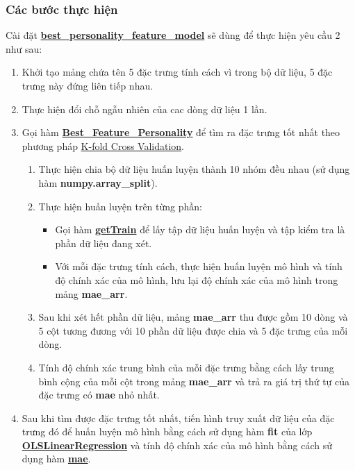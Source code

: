 \documentclass{report}
\begin{document}
        \subsubsection{Các bước thực hiện}
        Cài đặt \hyperref[sec:bestpersonalityfeaturemodel]{\textbf{best\_personality\_feature\_model}} sẽ dùng để thực hiện yêu cầu 2 như sau:
            \begin{enumerate}
                \item Khởi tạo mảng chứa tên 5 đặc trưng tính cách vì trong bộ dữ liệu, 5 đặc trưng này đứng liên tiếp nhau.
                \item Thực hiện đổi chỗ ngẫu nhiên của cac dòng dữ liệu 1 lần.
                \item Gọi hàm \hyperref[sec:BestFeaturePersonality]{\textbf{Best\_Feature\_Personality}}  để tìm ra đặc trưng tốt nhất theo phương pháp \hyperref[sec:k-fold-cross-validation]{K-fold Cross Validation}.
                \begin{enumerate}
                    \item Thực hiện chia bộ dữ liệu huấn luyện thành 10 nhóm đều nhau (sử dụng hàm \textbf{numpy.array\_split}).
                    \item Thực hiện huấn luyện trên từng phần:
                        \begin{itemize}
                            \item Gọi hàm \hyperref[sec:getTrain]{\textbf{getTrain}} để lấy tập dữ liệu huấn luyện và tập kiểm tra là phần dữ liệu đang xét.
                            \item Với mỗi đặc trưng tính cách, thực hiện huấn luyện mô hình và tính độ chính xác của mô hình, lưu lại độ chính xác của mô hình trong mảng \textbf{mae\_arr}.
                        \end{itemize}
                    \item Sau khi xét hết phần dữ liệu, mảng \textbf{mae\_arr} thu được gồm 10 dòng và 5 cột tương đương với 10 phần dữ liệu được chia và 5 đặc trưng của mỗi dòng.
                    \item Tính độ chính xác trung bình của mỗi đặc trưng bằng cách lấy trung bình cộng của mỗi cột trong mảng \textbf{mae\_arr} và trả ra giá trị thứ tự của đặc trưng có \textbf{mae} nhỏ nhất.
                \end{enumerate}
                \item Sau khi tìm được đặc trưng tốt nhất, tiến hình truy xuất dữ liệu của đặc trưng đó để huấn luyện mô hình bằng cách sử dụng hàm \textbf{fit} của lớp \hyperref[sec:olslinearregression]{\textbf{OLSLinearRegression}}  và tính độ chính xác của mô hình bằng cách sử dụng hàm \hyperref[sec:mae]{\textbf{mae}}.
            \end{enumerate}
        
\end{document}
